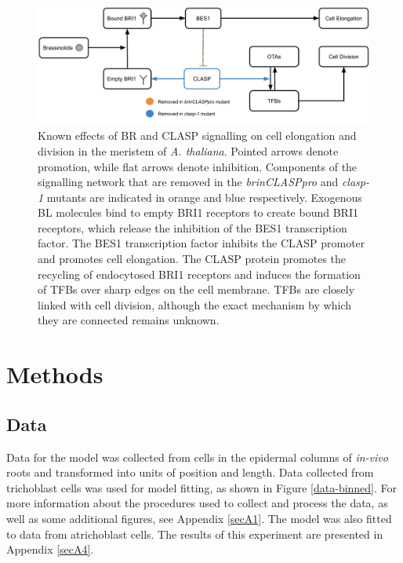 \documentclass[referee,pdflatex,sn-mathphys-num]{sn-jnl}
\begin{document}
\begin{figure}
\centering
\includegraphics[width=\textwidth]{network-complete.png}
\caption{Known effects of BR and CLASP signalling on cell elongation and division in the meristem of \emph{A. thaliana}. Pointed arrows denote promotion, while flat arrows denote inhibition. Components of the signalling network that are removed in the \emph{brinCLASPpro} and \emph{clasp-1} mutants are indicated in orange and blue respectively. Exogenous BL molecules bind to empty BRI1 receptors to create bound BRI1 receptors, which release the inhibition of the BES1 transcription factor. The BES1 transcription factor inhibits the CLASP promoter and promotes cell elongation. The CLASP protein promotes the recycling of endocytosed BRI1 receptors and induces the formation of TFBs over sharp edges on the cell membrane. TFBs are closely linked with cell division, although the exact mechanism by which they are connected remains unknown. }
\label{network}
\end{figure}

\section{Methods}\label{sec11}

\subsection{Data}

Data for the model was collected from cells in the epidermal columns of \emph{in-vivo} roots and transformed into units of position and length. Data collected from trichoblast cells was used for model fitting, as shown in Figure \ref{data-binned}. For more information about the procedures used to collect and process the data, as well as some additional figures, see Appendix \ref{secA1}. The model was also fitted to data from atrichoblast cells. The results of this experiment are presented in Appendix \ref{secA4}.
\end{document}
